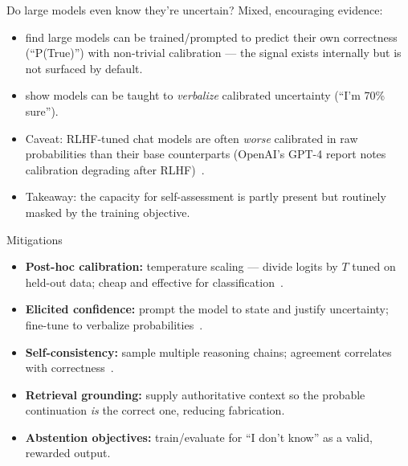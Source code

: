 \documentclass[aspectratio=169,11pt]{beamer}
\begin{document}
\begin{frame}{Do large models even know they're uncertain?}
  Mixed, encouraging evidence:
  \begin{itemize}
    \item \citet{kadavath2022know} find large models can be trained/prompted to predict their own correctness (``P(True)'') with non-trivial calibration --- the signal exists internally but is not surfaced by default.
    \item \citet{lin2022teaching} show models can be taught to \emph{verbalize} calibrated uncertainty (``I'm 70\% sure'').
    \item Caveat: RLHF-tuned chat models are often \emph{worse} calibrated in raw probabilities than their base counterparts (OpenAI's GPT-4 report notes calibration degrading after RLHF)~\citep{openai2023gpt4}.
    \item Takeaway: the capacity for self-assessment is partly present but routinely masked by the training objective.
  \end{itemize}
\end{frame}

\begin{frame}{Mitigations}
  \begin{itemize}
    \item \textbf{Post-hoc calibration:} temperature scaling --- divide logits by $T$ tuned on held-out data; cheap and effective for classification~\citep{guo2017calibration}.
    \item \textbf{Elicited confidence:} prompt the model to state and justify uncertainty; fine-tune to verbalize probabilities~\citep{lin2022teaching}.
    \item \textbf{Self-consistency:} sample multiple reasoning chains; agreement correlates with correctness~\citep{wang2023selfconsistency}.
    \item \textbf{Retrieval grounding:} supply authoritative context so the probable continuation \emph{is} the correct one, reducing fabrication.
    \item \textbf{Abstention objectives:} train/evaluate for ``I don't know'' as a valid, rewarded output.
  \end{itemize}
\end{frame}
\end{document}
